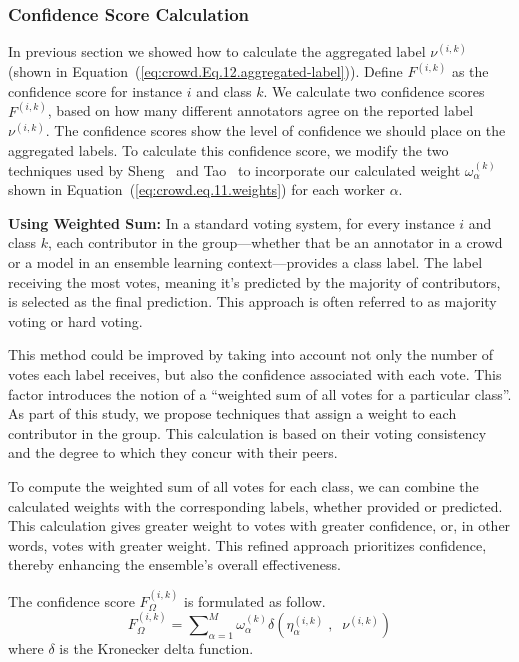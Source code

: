 \subsubsection{Confidence Score Calculation}
In previous section we showed how to calculate the aggregated label $\nu^{(i,k)}$ (shown in Equation~(\ref{eq:crowd.Eq.12.aggregated-label})). Define $F^{(i,k)} $ as the confidence score for instance $i $ and class $k $. We calculate two confidence scores $F^{(i,k)} $, based on how many different annotators agree on the reported label $\nu^{(i,k)}$. The confidence scores show the level of confidence we should place on the aggregated labels. To calculate this confidence score, we modify the two techniques used by Sheng~\cite{sheng_Majority_2019} and Tao~\cite{tao_Label_2020} to incorporate our calculated weight $\omega_{\alpha}^{(k)} $ shown in Equation~(\ref{eq:crowd.eq.11.weights})  for each worker $\alpha $.

\textbf{Using Weighted Sum:}
In a standard voting system, for every instance $i$ and class $k$, each contributor in the group—whether that be an annotator in a crowd or a model in an ensemble learning context—provides a class label. The label receiving the most votes, meaning it's predicted by the majority of contributors, is selected as the final prediction. This approach is often referred to as majority voting or hard voting.

This method could be improved by taking into account not only the number of votes each label receives, but also the confidence associated with each vote. This factor introduces the notion of a ``weighted sum of all votes for a particular class''. As part of this study, we propose techniques that assign a weight to each contributor in the group. This calculation is based on their voting consistency and the degree to which they concur with their peers.

To compute the weighted sum of all votes for each class, we can combine the calculated weights with the corresponding labels, whether provided or predicted. This calculation gives greater weight to votes with greater confidence, or, in other words, votes with greater weight. This refined approach prioritizes confidence, thereby enhancing the ensemble's overall effectiveness.

The confidence score $F_{\Omega}^{(i,k)}$ is formulated as follow.
\begin{equation}
    F_{\Omega}^{(i,k)} = {\sum\nolimits_{\alpha=1}^{M}{\omega_{\alpha}^{(k)} \delta\left(\eta_{\alpha}^{(i,k)} \;,\;\; \nu^{(i,k)} \right)}}
    \label{eq:crowd.Eq.13.confidence-score.freq}
\end{equation}
where $\delta $ is the Kronecker delta function.


